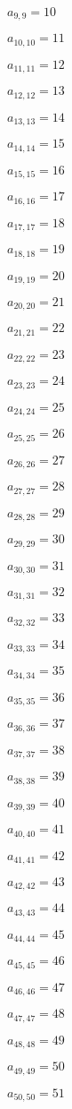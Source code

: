\documentclass[a4paper,12pt]{article}
\begin{document}
$a _{ 9, 9 } = 10$

$a _{ 10, 10 } = 11$

$a _{ 11, 11 } = 12$

$a _{ 12, 12 } = 13$

$a _{ 13, 13 } = 14$

$a _{ 14, 14 } = 15$

$a _{ 15, 15 } = 16$

$a _{ 16, 16 } = 17$

$a _{ 17, 17 } = 18$

$a _{ 18, 18 } = 19$

$a _{ 19, 19 } = 20$

$a _{ 20, 20 } = 21$

$a _{ 21, 21 } = 22$

$a _{ 22, 22 } = 23$

$a _{ 23, 23 } = 24$

$a _{ 24, 24 } = 25$

$a _{ 25, 25 } = 26$

$a _{ 26, 26 } = 27$

$a _{ 27, 27 } = 28$

$a _{ 28, 28 } = 29$

$a _{ 29, 29 } = 30$

$a _{ 30, 30 } = 31$

$a _{ 31, 31 } = 32$

$a _{ 32, 32 } = 33$

$a _{ 33, 33 } = 34$

$a _{ 34, 34 } = 35$

$a _{ 35, 35 } = 36$

$a _{ 36, 36 } = 37$

$a _{ 37, 37 } = 38$

$a _{ 38, 38 } = 39$

$a _{ 39, 39 } = 40$

$a _{ 40, 40 } = 41$

$a _{ 41, 41 } = 42$

$a _{ 42, 42 } = 43$

$a _{ 43, 43 } = 44$

$a _{ 44, 44 } = 45$

$a _{ 45, 45 } = 46$

$a _{ 46, 46 } = 47$

$a _{ 47, 47 } = 48$

$a _{ 48, 48 } = 49$

$a _{ 49, 49 } = 50$

$a _{ 50, 50 } = 51$
\end{document}
